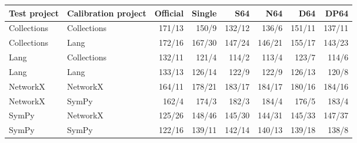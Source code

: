 \begin{tabular}{llrrrrrr}
\toprule
Test project & Calibration project & Official & Single & S64 & N64 & D64 & DP64 \\
\midrule
Collections & Collections & 171/13 & 150/9 & 132/12 & 136/6 & 151/11 & 137/11 \\
Collections & Lang & 172/16 & 167/30 & 147/24 & 146/21 & 155/17 & 143/23 \\
Lang & Collections & 132/11 & 121/4 & 114/2 & 113/4 & 123/7 & 114/6 \\
Lang & Lang & 133/13 & 126/14 & 122/9 & 122/9 & 126/13 & 120/8 \\
NetworkX & NetworkX & 164/11 & 178/21 & 183/17 & 184/17 & 180/16 & 184/16 \\
NetworkX & SymPy & 162/4 & 174/3 & 182/3 & 184/4 & 176/5 & 183/4 \\
SymPy & NetworkX & 125/26 & 148/46 & 145/30 & 144/31 & 145/33 & 147/37 \\
SymPy & SymPy & 122/16 & 139/11 & 142/14 & 140/13 & 139/18 & 138/8 \\
\bottomrule
\end{tabular}
